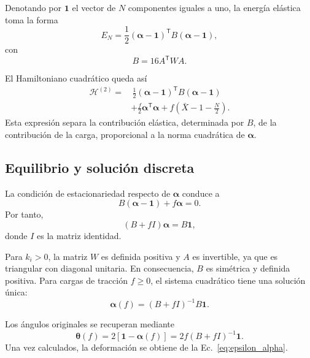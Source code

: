 \documentclass[11pt,a4paper]{article}
\begin{document}
Denotando por $\mathbf{1}$ el vector de $N$ componentes iguales
a uno, la energía elástica toma la forma
\begin{equation}
E_N
=
\frac12
(\boldsymbol{\alpha}-\mathbf{1})^{\mathsf T}
B
(\boldsymbol{\alpha}-\mathbf{1}),
\label{eq:energy_matrix_alpha}
\end{equation}
con
\begin{equation}
\boxed{
B=16A^{\mathsf T}WA.
}
\label{eq:B_definition}
\end{equation}

El Hamiltoniano cuadrático queda así
\begin{equation}
\boxed{
\begin{aligned}
\mathcal{H}^{(2)}
=
&\,\frac12
(\boldsymbol{\alpha}-\mathbf{1})^{\mathsf T}
B
(\boldsymbol{\alpha}-\mathbf{1})
\\
&+\frac f2
\boldsymbol{\alpha}^{\mathsf T}\boldsymbol{\alpha}
+f\left(\bar X-1-\frac N2\right).
\end{aligned}
}
\label{eq:H_quadratic_alpha}
\end{equation}
Esta expresión separa la contribución elástica, determinada
por $B$, de la contribución de la carga, proporcional a la
norma cuadrática de $\boldsymbol{\alpha}$.

\subsection{Equilibrio y solución discreta}

La condición de estacionariedad respecto de
$\boldsymbol{\alpha}$ conduce a
\begin{equation}
B(\boldsymbol{\alpha}-\mathbf{1})
+
f\boldsymbol{\alpha}
=0.
\end{equation}
Por tanto,
\begin{equation}
\boxed{
(B+fI)\boldsymbol{\alpha}=B\mathbf{1},
}
\label{eq:equilibrium_alpha}
\end{equation}
donde $I$ es la matriz identidad.

Para $k_i>0$, la matriz $W$ es definida positiva y $A$ es
invertible, ya que es triangular con diagonal unitaria.
En consecuencia, $B$ es simétrica y definida positiva.
Para cargas de tracción $f\geq0$, el sistema cuadrático
tiene una solución única:
\begin{equation}
\boldsymbol{\alpha}(f)
=
(B+fI)^{-1}B\mathbf{1}.
\label{eq:alpha_solution}
\end{equation}

Los ángulos originales se recuperan mediante
\begin{equation}
\boxed{
\boldsymbol{\theta}(f)
=
2\left[\mathbf{1}-\boldsymbol{\alpha}(f)\right]
=
2f(B+fI)^{-1}\mathbf{1}.
}
\label{eq:theta_solution_quadratic}
\end{equation}
Una vez calculados, la deformación se obtiene de la
Ec.~\eqref{eq:epsilon_alpha}.
\end{document}
